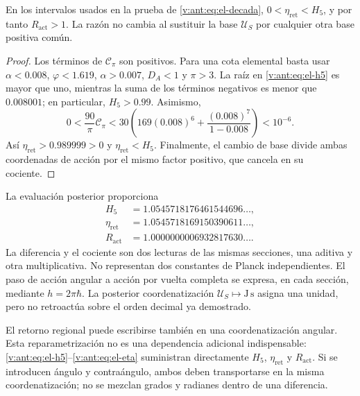 \begin{proposition}
En los intervalos usados en la prueba de \eqref{v:ant:eq:el-decada},
\(0<\eta_{\mathrm{ret}}<H_5\), y por tanto
\(R_{\mathrm{act}}>1\). La razón no cambia al sustituir la base
\(\mathcal U_S\) por cualquier otra base positiva común.
\end{proposition}
\begin{proof}
Los términos de \(\mathcal C_\pi\) son positivos. Para una cota
elemental basta usar \(\alpha<0.008\), \(\varphi<1.619\),
\(\alpha>0.007\), \(D_A<1\) y \(\pi>3\). La raíz en
\eqref{v:ant:eq:el-h5} es mayor que uno, mientras la suma de los términos
negativos es menor que \(0.008001\); en particular, \(H_5>0.99\).
Asimismo,
\[
 0<\frac{90}{\pi}\mathcal C_\pi
 <30\left(169(0.008)^6+
           \frac{(0.008)^7}{1-0.008}\right)<10^{-6}.
\]
Así \(\eta_{\mathrm{ret}}>0.989999>0\) y
\(\eta_{\mathrm{ret}}<H_5\). Finalmente, el cambio de base divide
ambas coordenadas de acción por el mismo factor positivo, que cancela en
su cociente.
\end{proof}

La evaluación posterior proporciona
\begin{align*}
 H_5&=1.0545718176461544696\ldots,\\
 \eta_{\mathrm{ret}}&=1.0545718169150390611\ldots,\\
 R_{\mathrm{act}}&=1.0000000006932817630\ldots.
\end{align*}
La diferencia y el cociente son dos lecturas de las mismas secciones,
una aditiva y otra multiplicativa. No representan dos constantes de
Planck independientes. El paso de acción angular a acción por vuelta
completa se expresa, en cada sección, mediante
\(h=2\pi\hbar\). La posterior coordenatización
\(\mathcal U_S\mapsto\mathrm{J\,s}\) asigna una unidad, pero no
retroactúa sobre el orden decimal ya demostrado.

El retorno regional puede escribirse también en una coordenatización angular.
Esta reparametrización no es una dependencia adicional indispensable:
\eqref{v:ant:eq:el-h5}--\eqref{v:ant:eq:el-eta} suministran directamente
\(H_5\), \(\eta_{\mathrm{ret}}\) y \(R_{\mathrm{act}}\). Si se
introducen ángulo y contraángulo, ambos deben transportarse en la misma
coordenatización; no se mezclan grados y radianes dentro de una diferencia.


